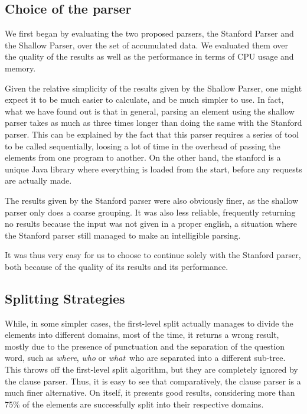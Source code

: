 \subsection{Choice of the parser} %
\label{sub:choice_of_the_parser}

We first began by evaluating the two proposed parsers, the Stanford Parser and the Shallow Parser, over the set of accumulated data. We evaluated them over the quality of the results as well as the performance in terms of CPU usage and memory.

Given the relative simplicity of the results given by the Shallow Parser, one might expect it to be much easier to calculate, and be much simpler to use. In fact, what we have found out is that in general, parsing an element using the shallow parser takes as much as three times longer than doing the same with the Stanford parser. This can be explained by the fact that this parser requires a series of tool to be called sequentially, loosing a lot of time in the overhead of passing the elements from one program to another. On the other hand, the stanford is a unique Java library where everything is loaded from the start, before any requests are actually made.

The results given by the Stanford parser were also obviously finer, as the shallow parser only does a coarse grouping. It was also less reliable, frequently returning no results because the input was not given in a proper english, a situation where the Stanford parser still managed to make an intelligible parsing.

It was thus very easy for us to choose to continue solely with the Stanford parser, both because of the quality of its results and its performance.


\subsection{Splitting Strategies} %
\label{sub:splitting_strategies}

While, in some simpler cases, the first-level split actually manages to divide the elements into different domains, most of the time, it returns a wrong result, mostly due to the presence of punctuation and the separation of the question word, such as \emph{where}, \emph{who} or \emph{what}\, who are separated into a different sub-tree. This throws off the first-level split algorithm, but they are completely ignored by the clause parser. Thus, it is easy to see that comparatively, the clause parser is a much finer alternative. On itself, it presents good results, considering more than 75\% of the elements are successfully split into their respective domains.

